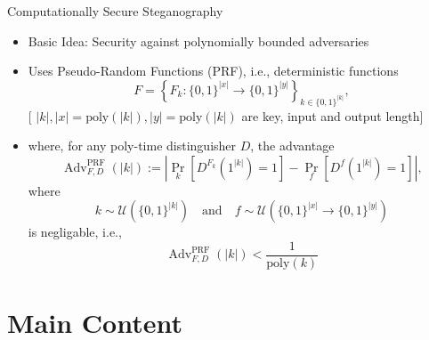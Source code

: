 \documentclass[8pt]{beamer}
\begin{document}
\begin{frame}{Computationally Secure Steganography}

\begin{itemize}
    \item Basic Idea: Security against polynomially bounded adversaries
    \item Uses Pseudo-Random Functions (PRF), i.e., deterministic functions
\[
F=\left\{
F_k:\{0,1\}^{|x|}\to\{0,1\}^{|y|}
\right\}_{k\in\{0,1\}^{|k|}},
\]
[ $|k|, |x|=\text{poly}(|k|), |y|=\text{poly}(|k|)$ are key, input and output length]
\item where, for any poly-time distinguisher $D$, the advantage
\[
\operatorname{Adv}^{\mathrm{PRF}}_{F,D}(|k|)
:=
\left|
\Pr_{k}
\left[
D^{F_k}(1^{|k|})=1
\right]
-
\Pr_{f}
\left[
D^{f}(1^{|k|})=1
\right]
\right|,
\]
where
\[
    k\sim\mathcal{U}\left(\{0,1\}^{|k|}\right) \quad \text{and}\quad
    f\sim\mathcal{U}\left(\{0,1\}^{|x|}\to\{0,1\}^{|y|}\right)
\]
is negligable, i.e., 
\[
\operatorname{Adv}^{\mathrm{PRF}}_{F,D}(|k|) < \frac{1}{\text{poly}(k)}
\]
\end{itemize}


\end{frame}

\section{Main Content}
\end{document}
